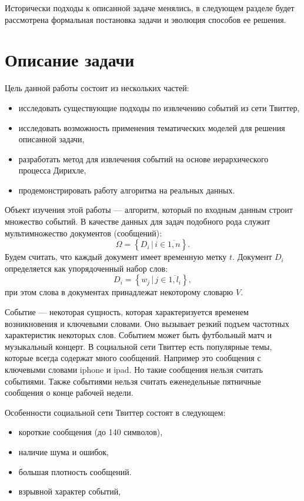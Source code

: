 \documentclass[12pt, a4paper]{article}
\begin{document}
	Исторически подходы к описанной задаче менялись, в следующем разделе будет рассмотрена формальная постановка задачи и эволюция способов ее решения.
	
  \section{Описание задачи}
	Цель данной работы состоит из нескольких частей:
\begin{itemize}
\item исследовать существующие подходы по извлечению событий из сети Твиттер,
\item исследовать возможность применения тематических моделей для решения описанной задачи,
\item разработать метод для извлечения событий на основе иерархического процесса Дирихле,
\item продемонстрировать работу алгоритма на реальных данных.
\end{itemize}	  
  
  Объект изучения этой работы --- алгоритм, который по входным данным строит множество событий. В качестве данных для задач подобного рода служит мультимножество документов (сообщений):
\begin{equation}
  \Omega = \left\{D_i \,\vert\, i \in \overline{1,n} \right\}.
  \end{equation}  
  Будем считать, что каждый документ имеет временную метку $t$. Документ $D_i$ определяется как упорядоченный набор слов:
\begin{equation}
  D_i = \left\{w_j \,\vert\, j \in \overline{ 1, l_i } \right\},
  \end{equation}  
   при этом слова в документах принадлежат некоторому словарю $V$. 
  
  Событие --- некоторая сущность, которая характеризуется временем возникновения и ключевыми словами. Оно вызывает резкий подъем частотных характеристик некоторых слов. Событием может быть футбольный матч и музыкальный концерт. В социальной сети Твиттер есть популярные темы, которые всегда содержат много сообщений. Например это сообщения с ключевыми словами iphone и ipad. Но такие сообщения нельзя считать событиями. Также событиями нельзя считать еженедельные пятничные сообщения о конце рабочей недели\cite{waim13}.
  
  Особенности социальной сети Твиттер состоят в следующем:
  \begin{itemize}
  \item короткие сообщения (до 140 символов),
  \item наличие шума и ошибок,
  \item большая плотность сообщений.
  \item взрывной характер событий,
  \end{itemize}
  
\end{document}
